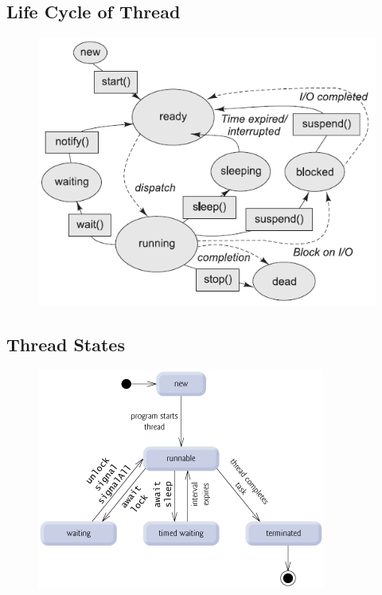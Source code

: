 \documentclass[12pt, a4paper]{book}
\begin{document}
\subsection{Life Cycle of Thread}
\begin{figure}[!h]
    \centering
    \includegraphics[width=0.9\linewidth]{figures/Life-cycle-of-Java-threads.png}
\end{figure}
\subsection{Thread States}
\begin{figure}[!h]
    \centering
    \includegraphics[width=0.9\linewidth]{figures/thread-states.png}
\end{figure}
\end{document}
